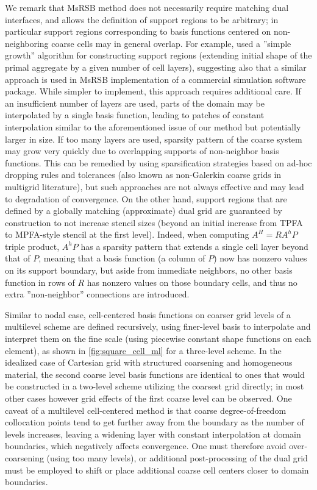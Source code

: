 We remark that MsRSB method does not necessarily require matching dual interfaces, and allows the definition of support regions to be arbitrary; in particular support regions corresponding to basis functions centered on non-neighboring coarse cells may in general overlap.   For example, \cite{Klemetsdal2020} used a ''simple growth'' algorithm for constructing support regions (extending initial shape of the primal aggregate by a given number of cell layers), suggesting also that a similar approach is used in MsRSB implementation of a commercial simulation software package.   While simpler to implement, this approach requires additional care.   If an insufficient number of layers are used, parts of the domain may be interpolated by a single basis function, leading to patches of constant interpolation similar to the aforementioned issue of our method but potentially larger in size.   If too many layers are used, sparsity pattern of the coarse system may grow very quickly due to overlapping supports of non-neighbor basis functions.   This can be remedied by using sparsification strategies based on ad-hoc dropping rules and tolerances (also known as non-Galerkin coarse grids in multigrid literature), but such approaches are not always effective and may lead to degradation of convergence.   On the other hand, support regions that are defined by a globally matching (approximate) dual grid are guaranteed by construction to not increase stencil sizes (beyond an initial increase from TPFA to MPFA-style stencil at the first level).   Indeed, when computing $A^H = RA^hP$ triple product, $A^hP$ has a sparsity pattern that extends a single cell layer beyond that of $P$, meaning that a basis function (a column of $P$) now has nonzero values on its support boundary, but aside from immediate neighbors, no other basis function in rows of $R$ has nonzero values on those boundary cells, and thus no extra ''non-neighbor'' connections are introduced.

Similar to nodal case, cell-centered basis functions on coarser grid levels of a multilevel scheme are defined recursively, using finer-level basis to interpolate and interpret them on the fine scale (using piecewise constant shape functions on each element), as shown in \cref{fig:square_cell_ml} for a three-level scheme.   In the idealized case of Cartesian grid with structured coarsening and homogeneous material, the second coarse level basis functions are identical to ones that would be constructed in a two-level scheme utilizing the coarsest grid directly; in most other cases however grid effects of the first coarse level can be observed.   One caveat of a multilevel cell-centered method is that coarse degree-of-freedom collocation points tend to get further away from the boundary as the number of levels increases, leaving a widening layer with constant interpolation at domain boundaries, which negatively affects convergence.   One must therefore avoid over-coarsening (using too many levels), or additional post-processing of the dual grid must be employed to shift or place additional coarse cell centers closer to domain boundaries.

